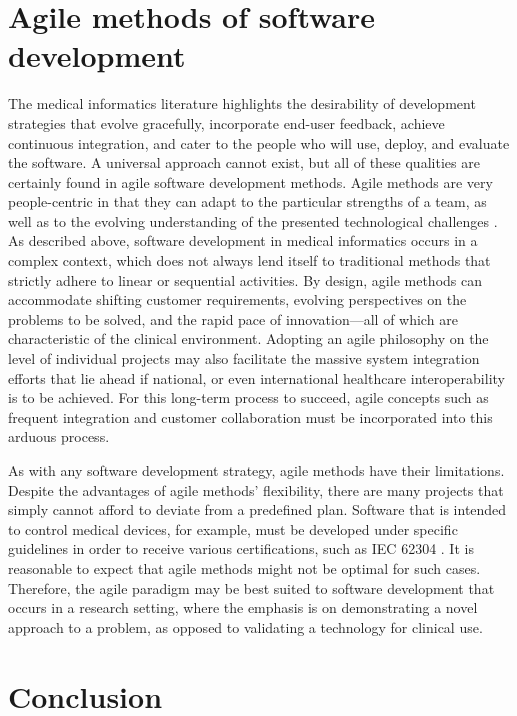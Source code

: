 \documentclass[12pt]{article} %
\begin{document}
\section{Agile methods of software development}
The medical informatics literature highlights the desirability of development strategies that evolve gracefully, incorporate end-user feedback, achieve continuous integration, and cater to the people who will use, deploy, and evaluate the software. A universal approach cannot exist, but all of these qualities are certainly found in agile software development methods. Agile methods are very people-centric in that they can adapt to the particular strengths of a team, as well as to the evolving understanding of the presented technological challenges \cite{cockburn2001}. As described above, software development in medical informatics occurs in a complex context, which does not always lend itself to traditional methods that strictly adhere to linear or sequential activities. By design, agile methods can accommodate shifting customer requirements, evolving perspectives on the problems to be solved, and the rapid pace of innovation---all of which are characteristic of the clinical environment. Adopting an agile philosophy on the level of individual projects may also facilitate the massive system integration efforts that lie ahead if national, or even international healthcare interoperability is to be achieved. For this long-term process to succeed, agile concepts such as frequent integration and customer collaboration must be incorporated into this arduous process.

As with any software development strategy, agile methods have their limitations. Despite the advantages of agile methods' flexibility, there are many projects that simply cannot afford to deviate from a predefined plan. Software that is intended to control medical devices, for example, must be developed under specific guidelines in order to receive various certifications, such as IEC 62304 \cite{huhn2010}. It is reasonable to expect that agile methods might not be optimal for such cases. Therefore, the agile paradigm may be best suited to software development that occurs in a research setting, where the emphasis is on demonstrating a novel approach to a problem, as opposed to validating a technology for clinical use.


\section{Conclusion}
\end{document}
